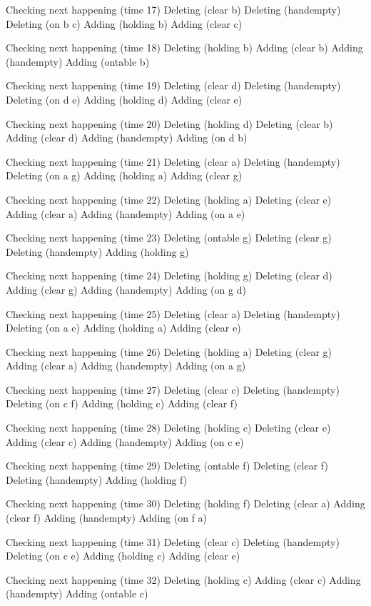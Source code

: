 Checking next happening (time 17)
Deleting (clear b)
Deleting (handempty)
Deleting (on b c)
Adding (holding b)
Adding (clear c)

Checking next happening (time 18)
Deleting (holding b)
Adding (clear b)
Adding (handempty)
Adding (ontable b)

Checking next happening (time 19)
Deleting (clear d)
Deleting (handempty)
Deleting (on d e)
Adding (holding d)
Adding (clear e)

Checking next happening (time 20)
Deleting (holding d)
Deleting (clear b)
Adding (clear d)
Adding (handempty)
Adding (on d b)

Checking next happening (time 21)
Deleting (clear a)
Deleting (handempty)
Deleting (on a g)
Adding (holding a)
Adding (clear g)

Checking next happening (time 22)
Deleting (holding a)
Deleting (clear e)
Adding (clear a)
Adding (handempty)
Adding (on a e)

Checking next happening (time 23)
Deleting (ontable g)
Deleting (clear g)
Deleting (handempty)
Adding (holding g)

Checking next happening (time 24)
Deleting (holding g)
Deleting (clear d)
Adding (clear g)
Adding (handempty)
Adding (on g d)

Checking next happening (time 25)
Deleting (clear a)
Deleting (handempty)
Deleting (on a e)
Adding (holding a)
Adding (clear e)

Checking next happening (time 26)
Deleting (holding a)
Deleting (clear g)
Adding (clear a)
Adding (handempty)
Adding (on a g)

Checking next happening (time 27)
Deleting (clear c)
Deleting (handempty)
Deleting (on c f)
Adding (holding c)
Adding (clear f)

Checking next happening (time 28)
Deleting (holding c)
Deleting (clear e)
Adding (clear c)
Adding (handempty)
Adding (on c e)

Checking next happening (time 29)
Deleting (ontable f)
Deleting (clear f)
Deleting (handempty)
Adding (holding f)

Checking next happening (time 30)
Deleting (holding f)
Deleting (clear a)
Adding (clear f)
Adding (handempty)
Adding (on f a)

Checking next happening (time 31)
Deleting (clear c)
Deleting (handempty)
Deleting (on c e)
Adding (holding c)
Adding (clear e)

Checking next happening (time 32)
Deleting (holding c)
Adding (clear c)
Adding (handempty)
Adding (ontable c)

